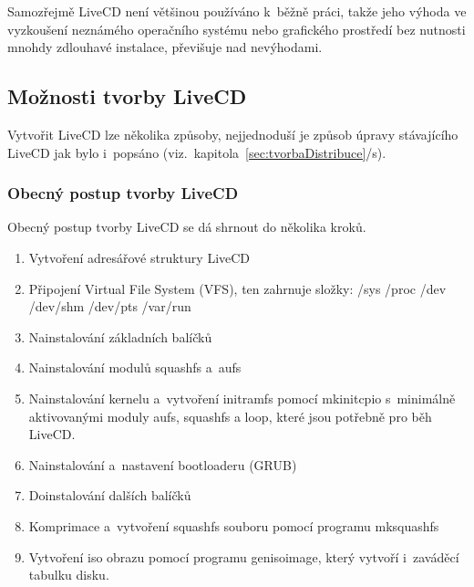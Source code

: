 \documentclass[a4paper,12pt]{article}
\newcommand{\odkazNaKapitolu}[1]{(viz.~kapitola~\ref{#1}/s\pageref{#1})}
\begin{document}
Samozřejmě LiveCD není většinou používáno k~běžně práci, takže jeho výhoda ve vyzkoušení neznámého operačního systému nebo grafického prostředí bez nutnosti mnohdy zdlouhavé instalace, převišuje nad nevýhodami.
\subsection{Možnosti tvorby LiveCD}
Vytvořit LiveCD lze několika způsoby, nejjednoduší je způsob úpravy stávajícího LiveCD jak bylo i~popsáno \odkazNaKapitolu{sec:tvorbaDistribuce}. 

\subsubsection{Obecný postup tvorby LiveCD}
Obecný postup tvorby LiveCD se dá shrnout do několika kroků.
\begin{enumerate}
 \item Vytvoření adresářové struktury LiveCD
 \item Připojení Virtual File System (VFS), ten zahrnuje složky: /sys /proc /dev /dev/shm /dev/pts /var/run
 \item Nainstalování základních balíčků
 \item Nainstalování modulů squashfs a~aufs
 \item Nainstalování kernelu a~vytvoření initramfs pomocí mkinitcpio s~minimálně aktivovanými moduly aufs, squashfs a loop, které jsou potřebně pro běh LiveCD.
 \item Nainstalování a~nastavení bootloaderu (GRUB)
 \item Doinstalování dalších balíčků
 \item Komprimace a~vytvoření squashfs souboru pomocí programu mksquashfs
 \item Vytvoření iso obrazu pomocí programu genisoimage, který vytvoří i~zaváděcí tabulku disku.
\end{enumerate}
\end{document}
